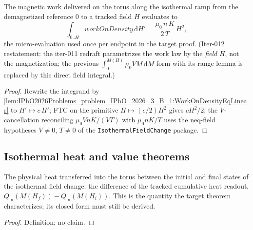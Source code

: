 \begin{lemma}
\label{lem:IPhO2026Problems_problem_IPhO_2026_3_B_1:LegWorkIntegralEval}
The magnetic work delivered on the torus along the isothermal ramp from
the demagnetized reference $0$ to a tracked field $H$ evaluates to
\[
\int_{0..H} \mathit{workOnDensity}\,\mathrm{d}H'
= \frac{\mu_0\, n\, K}{2\, T}\, H^2,
\]
the micro-evaluation used once per endpoint in the target proof.
(Iter-012 restatement: the iter-011 redraft parametrizes the work law by
the \emph{field} $H$, not the magnetization; the previous
$\int_0^{M(H)} \mu_0 V M\,\mathrm{d}M$ form with its range lemma is
replaced by this direct field integral.)
\end{lemma}
\begin{proof}
Rewrite the integrand by
\cref{lem:IPhO2026Problems_problem_IPhO_2026_3_B_1:WorkOnDensityEqLinear}
to $H' \mapsto c\,H'$; FTC on the primitive $H \mapsto (c/2)H^2$ gives
$c H^2/2$; the $V$-cancellation reconciling
$\mu_0 V n K/(V T)$ with $\mu_0 n K/T$ uses the neq-field hypotheses
$V \ne 0$, $T \ne 0$ of the \texttt{IsothermalFieldChange} package.
\end{proof}

\subsection*{Isothermal heat and value theorems}

\begin{definition}
\label{def:IPhO2026Problems_problem_IPhO_2026_3_B_1:HeatTransferredIntoTorus}
The physical heat transferred into the torus between the initial and final
states of the isothermal field change: the difference of the tracked
cumulative heat readout,
$Q_{\mathrm{in}}(M(H_f)) - Q_{\mathrm{in}}(M(H_i))$.  This is the quantity
the target theorem characterizes; its closed form must still be derived.
\end{definition}
\begin{proof}
Definition; no claim.
\end{proof}

